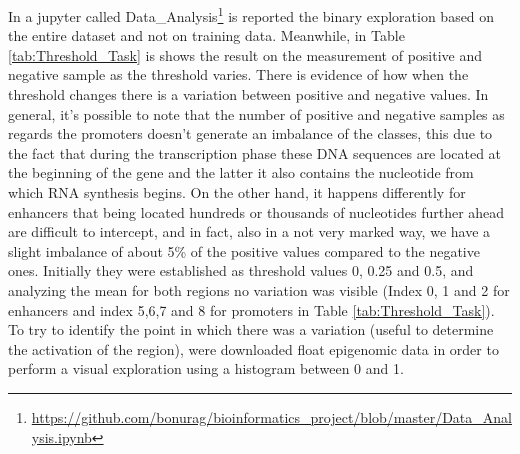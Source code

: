 \documentclass{article}
\begin{document}
\noindent
In a jupyter called Data\_Analysis\footnote{\url{https://github.com/bonurag/bioinformatics_project/blob/master/Data_Analysis.ipynb}} is reported the binary exploration based on the entire dataset and not on training data. Meanwhile, in Table \ref{tab:Threshold_Task} is shows the result on the measurement of positive and negative sample as the threshold varies. There is evidence of how when the threshold changes there is a variation between positive and negative values. In general, it's possible to note that the number of positive and negative samples as regards the promoters doesn't generate an imbalance of the classes, this due to the fact that during the transcription phase these DNA sequences are located at the beginning of the gene and the latter it also contains the nucleotide from which RNA synthesis begins. On the other hand, it happens differently for enhancers that being located hundreds or thousands of nucleotides further ahead are difficult to intercept, and in fact, also in a not very marked way, we have a slight imbalance of about 5\% of the positive values compared to the negative ones. 
\noindent
\newline\newline
Initially they were established as threshold values 0, 0.25 and 0.5, and analyzing the mean for both regions no variation was visible (Index 0, 1 and 2 for enhancers and index 5,6,7 and 8 for promoters in Table \ref{tab:Threshold_Task}). To try to identify the point in which there was a variation (useful to determine the activation of the region), were downloaded float epigenomic data in order to perform a visual exploration using a histogram between 0 and 1.
\end{document}
